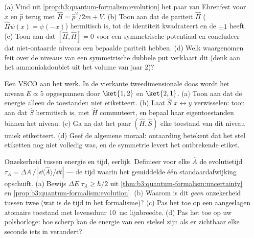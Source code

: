 \begin{exercise}[$\star\star$]\label{exo:b3:quantum-formalism:8}
(a) Vind uit \cref{prop:b3:quantum-formalism:evolution} het paar van
Ehrenfest voor $\hat x$ en $\hat p$ terug met $\hat H = \hat
p^2/2m + V$.
(b) Toon aan dat de pariteit $\hat\Pi$ ($\hat\Pi\psi(x) =
\psi(-x)$)
hermitisch is, tot de identiteit kwadrateert en de  $\pm1$
heeft. (c) Toon aan dat $[\hat H, \hat\Pi] = 0$ voor een symmetrische
potentiaal en concludeer dat niet-ontaarde niveaus een bepaalde pariteit
hebben. (d) Welk waargenomen feit over de niveaus van een symmetrische
dubbele put verklaart dit (denk aan het ammoniakdoublet uit het volume van
jaar 2)?
\end{exercise}

\begin{exercise}[$\star\star$]\label{exo:b3:quantum-formalism:9}
Een VSCO aan het werk. In de vierkante tweedimensionale doos wordt het
niveau $E
\propto 5$ opgespannen door $\ket{1,2}$ en $\ket{2,1}$. (a) Toon
aan dat de energie alleen de toestanden niet etiketteert. (b) Laat $\hat S$
$x
\leftrightarrow y$ verwisselen: toon aan dat $\hat S$ hermitisch is, met
$\hat
H$ commuteert, en bepaal haar eigentoestanden binnen het niveau. (c) Ga na dat het paar $(\hat H, \hat S)$
elke toestand van dit niveau uniek etiketteert. (d) Geef de algemene
moraal: ontaarding betekent dat het stel etiketten nog niet volledig was, en
de symmetrie levert het ontbrekende etiket.
\end{exercise}

\begin{exercise}[$\star\star\star$]\label{exo:b3:quantum-formalism:10}
Onzekerheid tussen energie en tijd, eerlijk. Definieer voor elke
 $\hat A$ de evolutietijd $\tau_A = \Delta A\,/\,|\dd\langle\hat
A\rangle/\dd t|$ --- de tijd waarin het gemiddelde één standaardafwijking
opschuift. (a) Bewijs $\Delta
E\;\tau_A \ge \hbar/2$ uit
\cref{thm:b3:quantum-formalism:uncertainty} en
\cref{prop:b3:quantum-formalism:evolution}. (b) Waarom is dit \emph{geen}
onzekerheid tussen twee  (wat is de tijd in het formalisme)?
(c) Pas het toe op een aangeslagen atomaire toestand met levensduur
\qty{10}{ns}: lijnbreedte. (d) Pas het toe op uw polshorloge: hoe scherp
kan de energie van een stelsel zijn als er zichtbaar elke seconde iets in
verandert?
\end{exercise}

